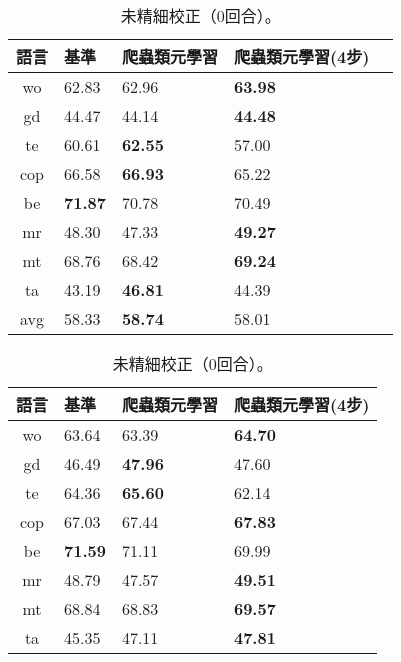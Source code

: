 \begin{table}[htbp]
    \begin{subtable}[h]{0.8\textwidth}
        \centering
            \begin{tabular}[!ht]{c|llll}
                \hline
                語言 & 基準 & 爬蟲類元學習 & 爬蟲類元學習(4步) \\
                \hline\hline
                wo & 62.83 & 62.96 & \textbf{63.98} \\
                gd & 44.47 & 44.14 & \textbf{44.48} \\
                te & 60.61 & \textbf{62.55} & 57.00 \\
                cop & 66.58 & \textbf{66.93} & 65.22 \\
                be & \textbf{71.87} & 70.78 & 70.49 \\
                mr & 48.30 & 47.33 & \textbf{49.27} \\
                mt & 68.76 & 68.42 & \textbf{69.24} \\
                ta & 43.19 & \textbf{46.81} & 44.39 \\
                \hline
                avg & 58.33 & \textbf{58.74} & 58.01 \\
                \hline
            \end{tabular}
            \caption{未精細校正（0回合）。}
    \end{subtable}
    \vfill
    \begin{subtable}[h]{0.8\textwidth}
        \centering
            \begin{tabular}[!ht]{c|lll}
                \hline
                語言 & 基準 & 爬蟲類元學習 & 爬蟲類元學習(4步) \\
                \hline\hline
                wo & 63.64 & 63.39 & \textbf{64.70} \\
                gd & 46.49 & \textbf{47.96} & 47.60 \\
                te & 64.36 & \textbf{65.60} & 62.14 \\
                cop & 67.03 & 67.44 & \textbf{67.83} \\
                be & \textbf{71.59} & 71.11 & 69.99 \\
                mr & 48.79 & 47.57 & \textbf{49.51} \\
                mt & 68.84 & 68.83 & \textbf{69.57} \\
                ta & 45.35 & 47.11 & \textbf{47.81} \\
                \hline

\end{tabular}
\end{subtable}
\end{table}
